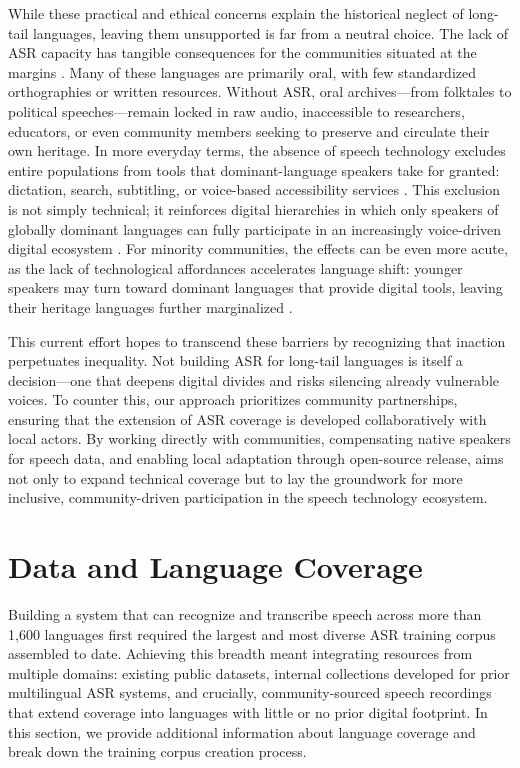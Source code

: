 \documentclass[]{fairmeta}
\begin{document}
While these practical and ethical concerns explain the historical neglect of long-tail languages, leaving them unsupported is far from a neutral choice. The lack of ASR capacity has tangible consequences for the communities situated at the margins \citep{joshi2020state}. Many of these languages are primarily oral, with few standardized orthographies or written resources. Without ASR, oral archives—from folktales to political speeches—remain locked in raw audio, inaccessible to researchers, educators, or even community members seeking to preserve and circulate their own heritage. In more everyday terms, the absence of speech technology excludes entire populations from tools that dominant-language speakers take for granted: dictation, search, subtitling, or voice-based accessibility services \citep{mainzinger-levow-2024-fine}. This exclusion is not simply technical; it reinforces digital hierarchies in which only speakers of globally dominant languages can fully participate in an increasingly voice-driven digital ecosystem \citep{SEAMLESS2025}. For minority communities, the effects can be even more acute, as the lack of technological affordances accelerates language shift: younger speakers may turn toward dominant languages that provide digital tools, leaving their heritage languages further marginalized \citep{kornai2013digital}.

This current effort hopes to transcend these barriers by recognizing that inaction perpetuates inequality. Not building ASR for long-tail languages is itself a decision—one that deepens digital divides and risks silencing already vulnerable voices. To counter this, our approach prioritizes community partnerships, ensuring that the extension of ASR coverage is developed collaboratively with local actors. By working directly with communities, compensating native speakers for speech data, and enabling local adaptation through open-source release, \OmniASR aims not only to expand technical coverage but to lay the groundwork for more inclusive, community-driven participation in the speech technology ecosystem.

\section{Data and Language Coverage}
\label{section:data}

Building a system that can recognize and transcribe speech across more than 1,600 languages first required the largest and most diverse ASR training corpus assembled to date. Achieving this breadth meant integrating resources from multiple domains: existing public datasets, internal collections developed for prior multilingual ASR systems, and crucially, community-sourced speech recordings that extend coverage into languages with little or no prior digital footprint. In this section, we provide additional information about language coverage and break down the training corpus creation process.
\end{document}
